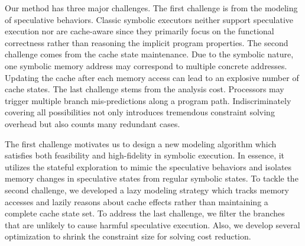 \documentclass[sigconf]{acmart}
\newcommand\ignore[1]{}
\begin{document}
Our method has three major challenges. The first challenge is from
the modeling of speculative behaviors. Classic symbolic executors
\cite{CadarDE08,PasareanuR10} neither support speculative execution nor are 
cache-aware since they primarily focus on the functional correctness rather 
than reasoning the implicit program properties. 
%
The second challenge comes from the cache state maintenance. Due to the 
symbolic nature, one symbolic memory address may correspond to multiple 
concrete addresses. Updating the cache after each memory access can lead 
to an explosive number of cache states. 
%
The last challenge stems from the analysis cost. Processors may trigger 
multiple branch mis-predictions along a program path. Indiscriminately 
covering all possibilities not only introduces tremendous constraint 
solving overhead but also counts many redundant cases. 


\ignore{
  Not only results in tremendous constraint solving overhead but 
  also redundantly counts many unnecessary cases.
  We assume always mis-predict to soundly analyze the affected cache behavior, 
  whereas this assumption introduces tremendous cost.
}


The first challenge motivates us to design a new modeling algorithm which 
satisfies both feasibility and high-fidelity in symbolic execution. In 
essence, it utilizes the stateful exploration to mimic the speculative 
behaviors and isolates memory changes in speculative states from regular 
symbolic states. 
%
To tackle the second challenge, we developed a lazy modeling strategy which 
tracks memory accesses and lazily reasons about cache effects rather than  
maintaining a complete cache state set. 
%
To address the last challenge, we filter the branches that are unlikely to 
cause harmful speculative execution. Also, we develop several optimization 
to shrink the constraint size for solving cost reduction.



\ignore{
Also, We develop a merging schema between the mimicked states and regular 
symbolic states to accumulate the cache side effects.

In general, we decompose the precise but lengthy constraint 
into smaller chunks without losing correctness, as well as utilizing 
executor kernel characteristics for faster computation.

However, the side effects caused by speculative execution are normally 
undetectable under standard symbolic execution. To overcome this problem,
we introduce the $\mathit{speculative~modeling}$ into symbolic execution. 
Thus, cache side effects are visible and cache timing leaks from speculative 
execution detectable now. 
}
\end{document}
